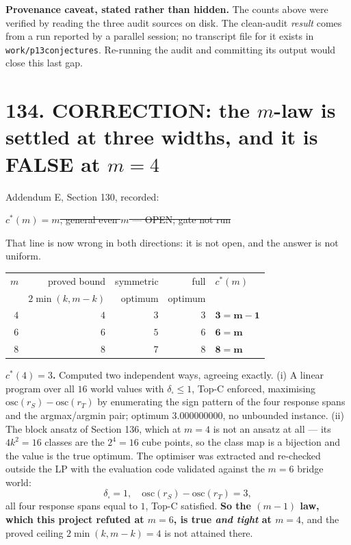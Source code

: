 \documentclass[9pt,twocolumn]{article}
\newcommand{\oldclaim}[1]{\sout{#1}}
\renewcommand{\_}{\CIGunderscore\allowbreak}
\begin{document}
\textbf{Provenance caveat, stated rather than hidden.} The counts above were verified by reading the three audit sources on disk. The clean-audit \emph{result} comes from a run reported by a parallel session; no transcript file for it exists in \texttt{work/p13\_conjectures}. Re-running the audit and committing its output would close this last gap.

\section*{134. CORRECTION: the $m$-law is settled at three widths, and it is FALSE at $m=4$}
Addendum E, Section 130, recorded:
\begin{center}\scriptsize\oldclaim{$c^\ast(m)=m$, general even $m$ --- OPEN; gate not run}\end{center}
That line is now wrong in both directions: it is not open, and the answer is not uniform.

\begin{center}\scriptsize
\begin{tabularx}{0.98\columnwidth}{r r r r X}
\toprule
$m$ & proved bound & symmetric & full & $c^\ast(m)$\\
 & $2\min(k,m{-}k)$ & optimum & optimum & \\
\midrule
$4$ & $4$ & $3$ & $3$ & $\mathbf{3=m-1}$\\
$6$ & $6$ & $5$ & $6$ & $\mathbf{6=m}$\\
$8$ & $8$ & $7$ & $8$ & $\mathbf{8=m}$\\
\bottomrule
\end{tabularx}
\end{center}

\textbf{$c^\ast(4)=3$.} Computed two independent ways, agreeing exactly. (i) A linear program over all $16$ world values with $\delta_\square\le1$, Top-C enforced, maximising $\mathrm{osc}(r_S)-\mathrm{osc}(r_T)$ by enumerating the sign pattern of the four response spans and the argmax/argmin pair; optimum $3.000000000$, no unbounded instance. (ii) The block ansatz of Section 136, which at $m=4$ is not an ansatz at all --- its $4k^2=16$ classes are the $2^4=16$ cube points, so the class map is a bijection and the value is the true optimum. The optimiser was extracted and re-checked outside the LP with the evaluation code validated against the $m=6$ bridge world:
\[\delta_\square=1,\quad \mathrm{osc}(r_S)-\mathrm{osc}(r_T)=3,\]
all four response spans equal to $1$, Top-C satisfied. \textbf{So the $(m-1)$ law, which this project refuted at $m=6$, is true \emph{and tight} at $m=4$}, and the proved ceiling $2\min(k,m-k)=4$ is not attained there.
\end{document}
